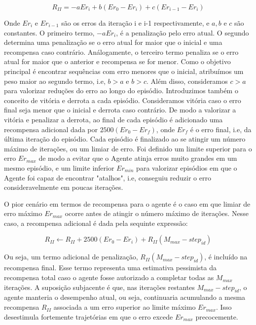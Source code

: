 \begin{equation}
\label{eq:eqR2}
    R_{II} = -aEr_{i} + b(Er_{0} - Er_{i}) + c(Er_{i-1} - Er_{i})
\end{equation}

\noindent
Onde $Er_{i}$ e $Er_{i-1}$ são os erros da iteração i e i-1 respectivamente, e $a, b$ e $c$ são constantes. 
O primeiro termo, $-aEr_{i}$, é a penalização pelo erro atual.
O segundo determina uma penalização se o erro atual for maior que o inicial e uma recompensa caso contrário.
Análogamente, o terceiro termo penaliza se o erro atual for maior que o anterior e recompensa se for menor.
Como o objetivo principal é encontrar sequências com erro menores que o inicial, atribuímos um peso maior ao segundo termo,
i.e, $b>a$ e $b>c$.
Além disso, consideramos $c>a$ para valorizar reduções do erro ao longo do episódio.  
Introduzimos também o conceito de vitória e derrota a cada episódio. 
Consideramos vitória caso o erro final seja menor que o inicial e derrota caso contrário. 
De modo a valorizar a vitória e penalizar a derrota, 
ao final de cada episódio é adicionado uma recompensa adicional dada por $2500(Er_{0} - Er_{f})$, 
onde $Er_{f}$ é o erro final, i.e, da última iteração do episódio. 
Cada episódio é finalizado ao se atingir um número máximo de iterações, ou um limiar de erro. 
Foi definido um limite superior para o erro $Er_{max}$ de modo a evitar que o Agente atinja erros muito grandes em um mesmo episódio,
e um limite inferior $Er_{min}$ para valorizar episódios em que o Agente foi capaz de encontrar "atalhos", i.e,
conseguiu reduzir o erro consideravelmente em poucas iterações.

O pior cenário em termos de recompensa para o agente é o caso em que limiar de erro máximo $Er_{max}$ ocorre antes de atingir o número máximo 
de iterações. Nesse caso, a recompensa adicional é dada pela sequinte expressão:

\begin{equation}
  \label{eq:R2adicional}
      R_{II} \gets R_{II} + 2500(Er_{0} - Er_{i}) + R_{II}(M_{max} - step_{id})
\end{equation}

Ou seja, um termo adicional de penalização,
$R_{II}(M_{max} - step_{id})$, é incluído na recompensa final.
Esse termo representa uma estimativa pessimista da recompensa total caso o agente fosse autorizado 
a completar todas as $M_{max}$ iterações. 
A suposição subjacente é que, nas iterações restantes $M_{max} - step_{id}$, 
o agente manteria o desempenho atual, ou seja, continuaria acumulando a mesma recompensa $R_{II}$ 
associada a um erro superior ao limite máximo $Er_{max}$. 
Isso desestimula fortemente trajetórias em que o erro excede $Er_{max}$ precocemente.


